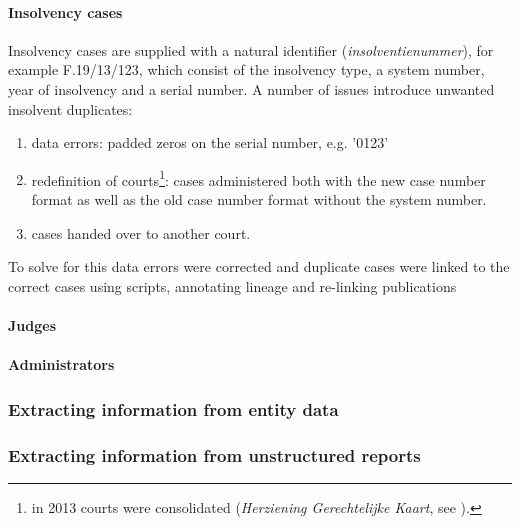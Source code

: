 \paragraph{Insolvency cases}
Insolvency cases are supplied with a natural identifier (\textit{insolventienummer}), for example F.19/13/123, which consist of the insolvency type, a system number, year of insolvency and a serial number. A number of issues introduce unwanted insolvent duplicates:
\begin{enumerate}
	\item data errors: padded zeros on the serial number, e.g. '0123'
	\item redefinition of courts\footnote{in 2013 courts were consolidated (\textit{Herziening Gerechtelijke Kaart}, see \cite{om:1}).}: cases administered both with the new case number format as well as the old case number format without the system number.
	\item cases handed over to another court.
\end{enumerate}
To solve for this data errors were corrected and duplicate cases were linked to the correct cases using scripts, annotating lineage and re-linking publications

\paragraph{Judges}
\paragraph{Administrators}

\subsubsection{Extracting information from entity data}
\subsubsection{Extracting information from unstructured reports}


